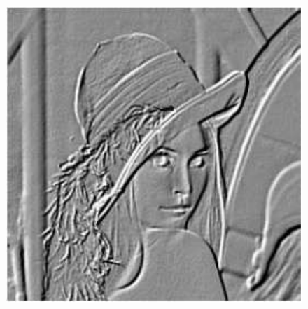 \documentclass{beamer}
\begin{document}
\begin{frame}
\begin{columns}
\begin{figure}
\includegraphics[width=.5\linewidth]{highlight}
\end{figure}
\vspace{-4ex}

\end{columns}
\end{frame}


\begin{frame}
%
%
\end{frame}
\end{document}
